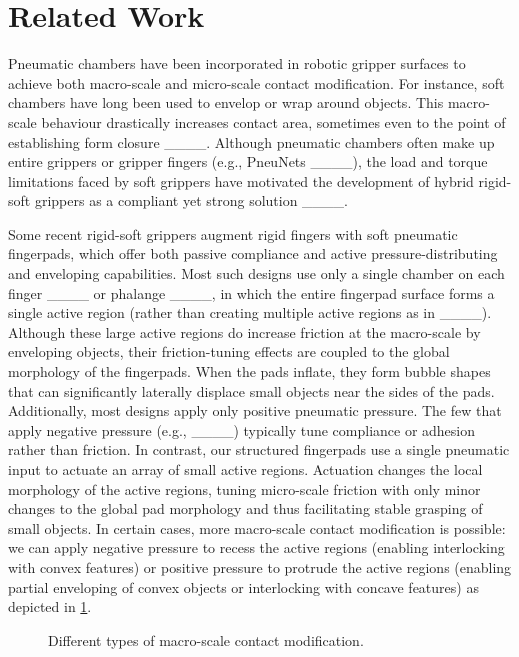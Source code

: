 \section{Related Work}
\label{sec:related}

Pneumatic chambers have been incorporated in robotic gripper surfaces to achieve both macro-scale and micro-scale contact modification.
%
For instance, soft chambers have long been used to envelop or wrap around objects.
%
This macro-scale behaviour drastically increases contact area, sometimes even to the point of establishing form closure ____.
%
Although pneumatic chambers often make up entire grippers or gripper fingers (e.g., PneuNets ____), the load and torque limitations faced by soft grippers have motivated the development of hybrid rigid-soft grippers as a compliant yet strong solution ____.

Some recent rigid-soft grippers augment rigid fingers with soft pneumatic fingerpads, which offer both passive compliance and active pressure-distributing and enveloping capabilities.
%
Most such designs use only a single chamber on each finger ____ or phalange ____, in which the entire fingerpad surface forms a single active region (rather than creating multiple active regions as in ____). 
%
Although these large active regions do increase friction at the macro-scale by enveloping objects, their friction-tuning effects are coupled to the global morphology of the fingerpads. 
%
When the pads inflate, they form bubble shapes that can significantly laterally displace small objects near the sides of the pads.
%
Additionally, most designs apply only positive pneumatic pressure. 
%
The few that apply negative pressure (e.g., ____) typically tune compliance or adhesion rather than friction. 
%
In contrast, our structured fingerpads use a single pneumatic input to actuate an array of small active regions. 
%
Actuation changes the local morphology of the active regions, tuning micro-scale friction with only minor changes to the global pad morphology and thus facilitating stable grasping of small objects. 
%
In certain cases, more macro-scale contact modification is possible: we can apply negative pressure to recess the active regions (enabling interlocking with convex features) or positive pressure to protrude the active regions (enabling partial enveloping of convex objects or interlocking with concave features) as depicted in \cref{fig:macro}. 

\begin{figure}[bt]
    \centering
    
    \vspace{0.1mm}
    \caption{Different types of macro-scale contact modification.}
    \label{fig:macro}
    \vspace{-3mm}
\end{figure}

